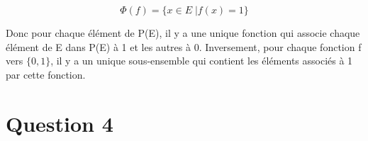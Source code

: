\documentclass[letterpaper,12pt,oneside,final]{book}
\begin{document}
\begin{equation*}
    \Phi (f) = \{x \in E \;\vert f(x)=1\}
\end{equation*}

Donc pour chaque élément de P(E), il y a une unique fonction qui associe chaque élément de E dans P(E) à 1 et les autres à 0.
Inversement, pour chaque fonction f vers $\{0,1\}$, il y a un unique sous-ensemble qui contient les éléments associés à 1 par cette fonction.






\newpage
\section*{Question 4}
\end{document}
